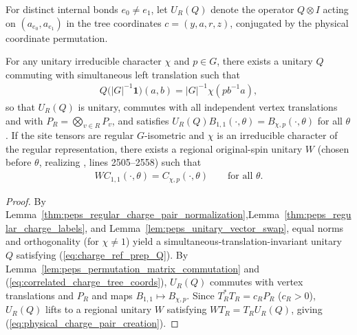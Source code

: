 \begin{definition}
    \label{def:peps_regular_charge_reference_matrix}
    \leanok
    For distinct internal bonds $e_0\neq e_1$, let $U_R(Q)$ denote the operator $Q\otimes I$ acting on $(a_{e_0},a_{e_1})$ in the tree coordinates $c=(y,a,r,z)$, conjugated by the physical coordinate permutation.
\end{definition}

\begin{lemma}
    \label{thm:peps_regular_physical_charge_pair_creation}
    \leanok
    For any unitary irreducible character $\chi$ and $p\in G$, there exists a unitary $Q$ commuting with simultaneous left translation such that
    \begin{align}
        Q\bigl(|G|^{-1}\mathbf1\bigr)(a,b)
        =|G|^{-1}\chi(pb^{-1}a), \label{eq:charge_ref_prep_Q}
    \end{align}
    so that $U_R(Q)$ is unitary, commutes with all independent vertex translations and with $P_R=\bigotimes_{v\in R}P_v$, and satisfies $U_R(Q)B_{1,1}(\cdot,\theta)=B_{\chi,p}(\cdot,\theta)$ for all $\theta$.
    If the site tensors are regular $G$-isometric and $\chi$ is an irreducible character of the regular representation, there exists a regional original-spin unitary $W$ (chosen before $\theta$, realizing \cite[charge-pair creation]{Schuch2010PEPS}, lines 2505--2558) such that
    \begin{align}
        W C_{1,1}(\cdot,\theta)=C_{\chi,p}(\cdot,\theta)
        \qquad\text{for all }\theta. \label{eq:physical_charge_pair_creation}
    \end{align}
\end{lemma}
\begin{proof}\leanok
    By Lemma~\ref{thm:peps_regular_charge_pair_normalization},Lemma~\ref{thm:peps_regular_charge_labels}, and Lemma~\ref{lem:peps_unitary_vector_swap}, equal norms and orthogonality (for $\chi\neq 1$) yield a simultaneous-translation-invariant unitary $Q$ satisfying (\ref{eq:charge_ref_prep_Q}).
    By Lemma~\ref{lem:peps_permutation_matrix_commutation} and (\ref{eq:correlated_charge_tree_coords}), $U_R(Q)$ commutes with vertex translations and $P_R$ and maps $B_{1,1}\mapsto B_{\chi,p}$.
    Since $T_R^*T_R=c_RP_R$ ($c_R>0$), $U_R(Q)$ lifts to a regional unitary $W$ satisfying $WT_R=T_RU_R(Q)$, giving (\ref{eq:physical_charge_pair_creation}).
\end{proof}


